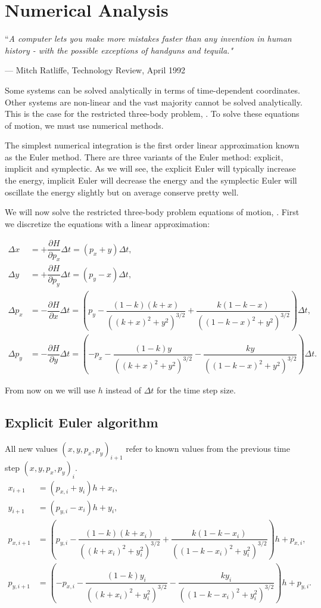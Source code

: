 \chapter{Numerical Analysis} \label{ch:numerical-analysis}
\epigraph{``\itshape{A computer lets you make more mistakes faster than any invention in human history - with the possible exceptions of handguns and tequila.}"}{--- \textup{Mitch Ratliffe}, Technology Review, April 1992}

Some systems can be solved analytically in terms of time-dependent coordinates. Other systems are non-linear and the vast majority cannot be solved analytically. This is the case for the restricted three-body problem, . To solve these equations of motion, we must use numerical methods.

The simplest numerical integration is the first order linear approximation known as the Euler method. There are three variants of the Euler method: explicit, implicit and symplectic. As we will see, the explicit Euler will typically increase the energy, implicit Euler will decrease the energy and the symplectic Euler will oscillate the energy slightly but on average conserve pretty well.

We will now solve the restricted three-body problem equations of motion, . First we discretize the equations with a linear approximation:

\begin{align}
\Delta x &= +\dfrac{\partial H}{\partial p_x}\Delta t = (p_x + y)\Delta t, \\[0.2cm]
\Delta y &= +\dfrac{\partial H}{\partial p_y}\Delta t = (p_y - x)\Delta t, \\[0.2cm]
\Delta p_x &= -\dfrac{\partial H}{\partial x}\Delta t = \left(p_y - \dfrac{(1-k)(k+x)}{((k+x)^2+y^2)^{3/2}} + \dfrac{k(1-k-x)}{((1-k-x)^2+y^2)^{3/2}}\right)\Delta t, \\[0.2cm]
\Delta p_y &= -\dfrac{\partial H}{\partial y}\Delta t = \left(-p_x - \dfrac{(1-k)y}{((k+x)^2+y^2)^{3/2}} - \dfrac{k y}{((1-k-x)^2+y^2)^{3/2}}\right)\Delta t.
\end{align}

From now on we will use $h$ instead of $\Delta t$ for the time step size.

\section{Explicit Euler algorithm}
All new values $(x,y,p_x,p_y)_{i+1}$ refer to known values from the previous time step $(x,y,p_x,p_y)_i$.
\begin{align}
x_{i+1} &= (p_{x,i} + y_i)h + x_i, \\[0.2cm]
y_{i+1} &= (p_{y,i} - x_i)h + y_i, \\[0.2cm]
p_{x,i+1} &= \left(p_{y,i} - \dfrac{(1-k)(k+x_i)}{((k+x_i)^2+y_i^2)^{3/2}} + \dfrac{k(1-k-x_i)}{((1-k-x_i)^2+y_i^2)^{3/2}}\right)h + p_{x,i}, \\[0.2cm]
p_{y,i+1} &= \left(-p_{x,i} - \dfrac{(1-k)y_i}{((k+x_i)^2+y_i^2)^{3/2}} - \dfrac{k y_i}{((1-k-x_i)^2+y_i^2)^{3/2}}\right)h + p_{y,i}.
\end{align}

